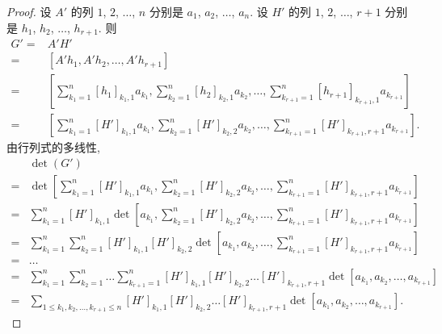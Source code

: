 \documentclass[../libro.tex]{subfiles}
\begin{document}
\begin{proof}
    设 \(A'\) 的列
    \(1\), \(2\), \(\dots\), \(n\)
    分别是 \(a_1\), \(a_2\), \(\dots\), \(a_n\).
    设 \(H'\) 的列
    \(1\), \(2\), \(\dots\), \(r+1\)
    分别是 \(h_1\), \(h_2\), \(\dots\), \(h_{r+1}\).
    则
    \begin{align*}
        G'
        = {} &
        A' H'
        \\
        = {} &
        [A' h_1, A' h_2, \dots, A' h_{r+1}]
        \\
        = {} &
        \left[
            \sum_{k_1 = 1}^{n} {[h_1]_{k_1,1} a_{k_1}},
            \sum_{k_2 = 1}^{n} {[h_2]_{k_2,1} a_{k_2}},
            \dots,
            \sum_{k_{r+1} = 1}^{n} {[h_{r+1}]_{k_{r+1},1} a_{k_{r+1}}}
        \right]
        \\
        = {} &
        \left[
            \sum_{k_1 = 1}^{n} {[H']_{k_1,1} a_{k_1}},
            \sum_{k_2 = 1}^{n} {[H']_{k_2,2} a_{k_2}},
            \dots,
            \sum_{k_{r+1} = 1}^{n} {[H']_{k_{r+1},r+1} a_{k_{r+1}}}
        \right].
    \end{align*}
    由行列式的多线性,
    \begin{align*}
        &
        \det {(G')}
        \\
        = {} &
        \det {
            \left[
                \sum_{k_1 = 1}^{n} [H']_{k_1,1} a_{k_1},
                \sum_{k_2 = 1}^{n} [H']_{k_2,2} a_{k_2},
                \dots,
                \sum_{k_{r+1} = 1}^{n} [H']_{k_{r+1},r+1} a_{k_{r+1}}
            \right]
        }
        \\
        = {} &
        \sum_{k_1 = 1}^{n}
        [H']_{k_1,1}
        \det {
            \left[
                a_{k_1},
                \sum_{k_2 = 1}^{n} [H']_{k_2,2} a_{k_2},
                \dots,
                \sum_{k_{r+1} = 1}^{n} [H']_{k_{r+1},r+1} a_{k_{r+1}}
            \right]
        }
        \\
        = {} &
        \sum_{k_1 = 1}^{n}
        \sum_{k_2 = 1}^{n}
        [H']_{k_1,1}
        [H']_{k_2,2}
        \det {
            \left[
                a_{k_1},
                a_{k_2},
                \dots,
                \sum_{k_{r+1} = 1}^{n} [H']_{k_{r+1},r+1} a_{k_{r+1}}
            \right]
        }
        \\
        = {} &
        \dots
        \\
        = {} &
        \sum_{k_1 = 1}^{n}
        \sum_{k_2 = 1}^{n}
        \dots
        \sum_{k_{r+1} = 1}^{n}
        [H']_{k_1,1}
        [H']_{k_2,2}
        \dots
        [H']_{k_{r+1},r+1}
        \det {[a_{k_1}, a_{k_2}, \dots, a_{k_{r+1}}]}
        \\
        = {} &
        \sum_{1 \leq k_1, k_2, \dots, k_{r+1} \leq n}
        [H']_{k_1,1}
        [H']_{k_2,2}
        \dots
        [H']_{k_{r+1},r+1}
        \det {[a_{k_1}, a_{k_2}, \dots, a_{k_{r+1}}]}.
    \end{align*}


\end{proof}
\end{document}
